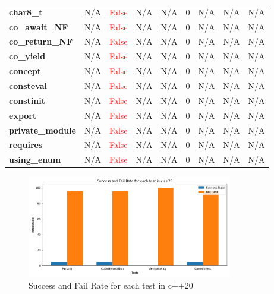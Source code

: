 \documentclass{article}
\begin{document}
\begin{xltabular}{\textwidth}{lcccccccc}
\textbf{{\fontsize{10}{12}\selectfont char8\_t}}& N/A&\textcolor{red}{False}& N/A&N/A& 0&N/A& N/A&N/A \\[0.5ex]
\textbf{{\fontsize{10}{12}\selectfont co\_await\_NF}}& N/A&\textcolor{red}{False}& N/A&N/A& 0&N/A& N/A&N/A \\[0.5ex]
\textbf{{\fontsize{10}{12}\selectfont co\_return\_NF}}& N/A&\textcolor{red}{False}& N/A&N/A& 0&N/A& N/A&N/A \\[0.5ex]
\textbf{{\fontsize{10}{12}\selectfont co\_yield}}& N/A&\textcolor{red}{False}& N/A&N/A& 0&N/A& N/A&N/A \\[0.5ex]
\textbf{{\fontsize{10}{12}\selectfont concept}}& N/A&\textcolor{red}{False}& N/A&N/A& 0&N/A& N/A&N/A \\[0.5ex]
\textbf{{\fontsize{10}{12}\selectfont consteval}}& N/A&\textcolor{red}{False}& N/A&N/A& 0&N/A& N/A&N/A \\[0.5ex]
\textbf{{\fontsize{10}{12}\selectfont constinit}}& N/A&\textcolor{red}{False}& N/A&N/A& 0&N/A& N/A&N/A \\[0.5ex]
\textbf{{\fontsize{10}{12}\selectfont export}}& N/A&\textcolor{red}{False}& N/A&N/A& 0&N/A& N/A&N/A \\[0.5ex]
\textbf{{\fontsize{10}{12}\selectfont private\_module}}& N/A&\textcolor{red}{False}& N/A&N/A& 0&N/A& N/A&N/A \\[0.5ex]
\textbf{{\fontsize{10}{12}\selectfont requires}}& N/A&\textcolor{red}{False}& N/A&N/A& 0&N/A& N/A&N/A \\[0.5ex]
\textbf{{\fontsize{10}{12}\selectfont using\_enum}}& N/A&\textcolor{red}{False}& N/A&N/A& 0&N/A& N/A&N/A \\[0.5ex]
\bottomrule
\end{xltabular}
\newpage
\begin{figure}[h!]
\centering
\includegraphics[width=0.8\textwidth]{../reports/artisan/images/c++20.png}
\caption{Success and Fail Rate for each test in c++20}
\label{fig:c++20}
\end{figure}
\newpage
\end{document}
